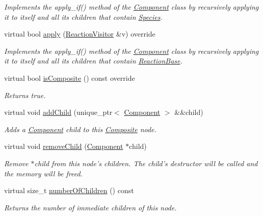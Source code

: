 \begin{DoxyCompactItemize}
\begin{DoxyCompactList}\small\item\em Implements the apply\+\_\+if() method of the \hyperlink{classComponent}{Component} class by recursively applying it to itself and all its children that contain \hyperlink{classSpecies}{Species}. \end{DoxyCompactList}\item 
virtual bool \hyperlink{classComposite_aa4a608ee92aaaa6e0d63278595707474}{apply} (\hyperlink{classReactionVisitor}{Reaction\+Visitor} \&v) override
\begin{DoxyCompactList}\small\item\em Implements the apply\+\_\+if() method of the \hyperlink{classComponent}{Component} class by recursively applying it to itself and all its children that contain \hyperlink{classReactionBase}{Reaction\+Base}. \end{DoxyCompactList}\item 
virtual bool \hyperlink{classComposite_ae2c806010c5c1d2d166ce01f2710c271}{is\+Composite} () const override
\begin{DoxyCompactList}\small\item\em Returns true. \end{DoxyCompactList}\item 
virtual void \hyperlink{classComposite_aa3ebdb54e65379954e5f28cd84f00be0}{add\+Child} (unique\+\_\+ptr$<$ \hyperlink{classComponent}{Component} $>$ \&\&child)
\begin{DoxyCompactList}\small\item\em Adds a \hyperlink{classComponent}{Component} child to this \hyperlink{classComposite}{Composite} node. \end{DoxyCompactList}\item 
virtual void \hyperlink{classComposite_a1e62d11f4c16844277b215a2069c14be}{remove\+Child} (\hyperlink{classComponent}{Component} $\ast$child)
\begin{DoxyCompactList}\small\item\em Remove $\ast$child from this node's children. The child's destructor will be called and the memory will be freed. \end{DoxyCompactList}\item 
virtual size\+\_\+t \hyperlink{classComposite_ab00f34ad7c8f7cd90ea9392bd54fd62a}{number\+Of\+Children} () const 
\begin{DoxyCompactList}\small\item\em Returns the number of immediate children of this node. \end{DoxyCompactList}\item 

\end{DoxyCompactItemize}
